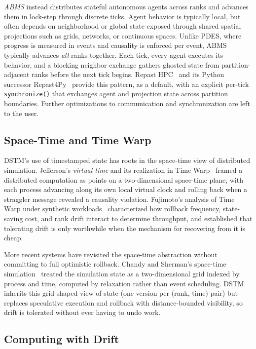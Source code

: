 \emph{ABMS} instead distributes stateful autonomous agents
across ranks and advances them in lock-step through discrete
ticks. Agent behavior is typically local, but often depends on
neighborhood or global state exposed through shared spatial
projections such as grids, networks, or continuous spaces. Unlike
PDES, where progress is measured in events and causality is
enforced per event, ABMS typically advances \emph{all} ranks
together. Each tick, every agent executes its behavior, and a blocking neighbor exchange gathers ghosted state from partition-adjacent ranks before the next tick begins. Repast HPC~\cite{repast-hpc}
and its Python successor Repast4Py~\cite{repast4py} provide this
pattern, as a default, with an explicit per-tick \texttt{synchronize()} that
exchanges agent and projection state across partition boundaries. Further optimizations
to communication and synchronization are left to the user. 

\subsection{Space-Time and Time Warp}

DSTM's use of timestamped state has roots in the space-time view of
distributed simulation. Jefferson's \emph{virtual time} and its
realization in Time Warp~\cite{Time-Warp} framed a distributed
computation as points on a two-dimensional space-time plane, with
each process advancing along its own local virtual clock and rolling
back when a straggler message revealed a causality violation.
Fujimoto's analysis of Time Warp under synthetic
workloads~\cite{fujimoto1990phold} characterized how rollback
frequency, state-saving cost, and rank drift interact to determine
throughput, and established that tolerating drift is only
worthwhile when the mechanism for recovering from it is cheap.

More recent systems have revisited the space-time abstraction
without committing to full optimistic rollback. Chandy and
Sherman's space-time simulation~\cite{chandy-sherman} treated
the simulation state as a two-dimensional grid indexed by process
and time, computed by relaxation rather than event scheduling.
DSTM inherits this grid-shaped view of state (one version per
(rank, time) pair) but replaces speculative execution and
rollback with distance-bounded visibility, so drift is tolerated
without ever having to undo work.

\subsection{Computing with Drift}

